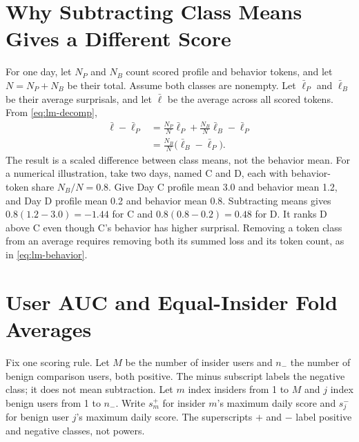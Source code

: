 \documentclass[12pt]{report}
\begin{document}
\section{Why Subtracting Class Means Gives a Different Score}
\label{sec:lm-naive-proof}
For one day, let $N_P$ and $N_B$ count scored profile and
behavior tokens, and let $N=N_P+N_B$ be their total. Assume
both classes are nonempty. Let $\bar\ell_P$ and $\bar\ell_B$
be their average surprisals, and let $\bar\ell$ be the
average across all scored tokens. From \eqref{eq:lm-decomp},
\begin{equation}
\begin{split}
\bar\ell-\bar\ell_P
 &=\frac{N_P}{N}\bar\ell_P+\frac{N_B}{N}\bar\ell_B-\bar\ell_P\\
 &=\frac{N_B}{N}\bigl(\bar\ell_B-\bar\ell_P\bigr).
\end{split}
\label{eq:lm-naive}
\end{equation}
The result is a scaled difference between class means, not
the behavior mean. For a numerical illustration, take two days,
named C and D, each with behavior-token share $N_B/N=0.8$.
Give Day C profile mean 3.0 and behavior mean 1.2, and Day D
profile mean 0.2 and behavior mean 0.8. Subtracting means gives
$0.8(1.2-3.0)=-1.44$ for C and $0.8(0.8-0.2)=0.48$ for D.
It ranks D above C even though C's behavior has higher surprisal.
Removing a token class from an average requires removing both
its summed loss and its token count, as in \eqref{eq:lm-behavior}.

\section{User AUC and Equal-Insider Fold Averages}
\label{sec:lm-auc-proof}
Fix one scoring rule. Let $M$ be the number of insider users
and $n_-$ the number of benign comparison users, both positive.
The minus subscript labels the negative class; it does not
mean subtraction. Let $m$ index insiders from 1 to $M$ and
$j$ index benign users from 1 to $n_-$. Write $s_m^+$ for
insider $m$'s maximum daily score and $s_j^-$ for benign
user $j$'s maximum daily score. The superscripts $+$ and $-$
label positive and negative classes, not powers.
\end{document}

